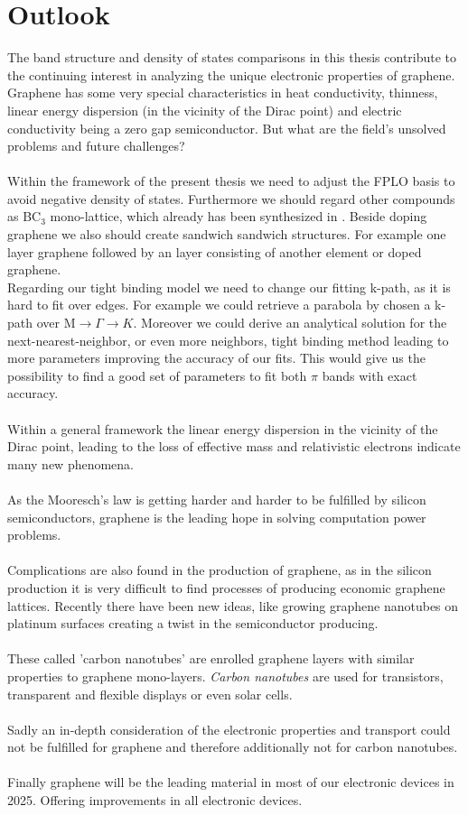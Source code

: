 \chapter{Outlook}
	The band structure and density of states comparisons in this thesis contribute to the continuing interest in analyzing the unique electronic properties of graphene. \\
	Graphene has some very special characteristics in heat conductivity, thinness, linear energy dispersion (in the vicinity of the Dirac point) and electric conductivity being a zero gap semiconductor. But what are the field's unsolved problems and future challenges? \\\\
	Within the framework of the present thesis we need to adjust the FPLO basis to avoid negative density of states. Furthermore we should regard other compounds as BC$_3$ mono-lattice, which already has been synthesized in \cite{BC3}. Beside doping graphene we also should create sandwich sandwich structures. For example one layer graphene followed by an layer consisting of another element or doped graphene.\\
	Regarding our tight binding model we need to change our fitting k-path, as it is hard to fit over edges. For example we could retrieve a parabola by chosen a k-path over M$\rightarrow \Gamma \rightarrow K$. Moreover we could derive an analytical solution for the next-nearest-neighbor, or even more neighbors, tight binding method leading to more parameters improving the accuracy of our fits. This would give us the possibility to find a good set of parameters to fit both $\pi$ bands with exact accuracy. \\\\
	Within a general framework the linear energy dispersion in the vicinity of the Dirac point, leading to the loss of effective mass and relativistic electrons indicate many new phenomena. \\\\
	As the Mooresch's law is getting harder and harder to be fulfilled by silicon semiconductors, graphene is the leading hope in solving computation power problems. \\\\
	Complications are also found in the production of graphene, as in the silicon production it is very difficult to find processes of producing economic graphene lattices. Recently there have been new ideas, like growing graphene nanotubes on platinum surfaces creating a twist in the semiconductor producing.\\\\
	These called 'carbon nanotubes' are enrolled graphene layers with similar properties to graphene mono-layers. \textit{Carbon nanotubes} are used for transistors, transparent and flexible displays or even solar cells. \\\\
	Sadly an in-depth consideration of the electronic properties and transport could not be fulfilled for graphene and therefore additionally not for carbon nanotubes.\\\\
	Finally graphene will be the leading material in most of our electronic devices in 2025. Offering improvements in all electronic devices.
		